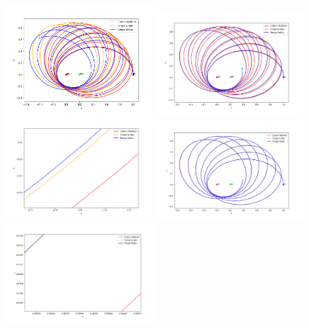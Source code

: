 \documentclass[preprint,titlepage,preprintnumbers,amsmath,amssymb,aps,11pt]{revtex4-2}
\begin{document}
\begin{figure}
    \centering
    \includegraphics[width=0.49\textwidth]{Overlay 400 0.005.png}
    \includegraphics[width=0.49\textwidth]{Overlay 800 0.0025.png}
    \includegraphics[width=0.49\textwidth]{Overlay 800 0.0025 Zoom.png}
    \includegraphics[width=0.49\textwidth]{Overlay 4000 0.0005.png}
    \includegraphics[width=0.5\textwidth]{Overlay 4000 0.0005 Zoom.png}

\end{figure}
\end{document}
